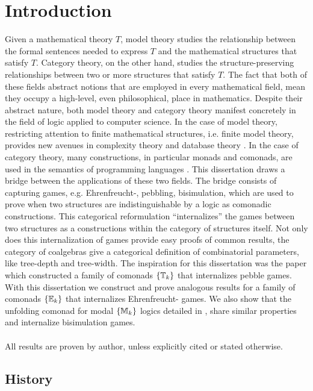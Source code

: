 \chapter{Introduction} 
Given a mathematical theory $T$, model theory studies the relationship between the formal sentences needed to express $T$ and the mathematical structures that satisfy $T$. Category theory, on the other hand, studies the structure-preserving relationships between two or more structures that satisfy $T$. The fact that both of these fields abstract notions that are employed in every mathematical field, mean they occupy a high-level, even philosophical\cite{Mancosu2010}\cite{Landry2017}, place in mathematics. Despite their abstract nature, both model theory and category theory manifest concretely in the field of logic applied to computer science. In the case of model theory, restricting attention to finite mathematical structures, i.e. finite model theory, provides new avenues in complexity theory \cite{Immerman1998} and database theory \cite{Abiteboul1995}. In the case of category theory, many constructions, in particular monads and comonads, are used in the semantics of programming languages \cite{BrookesGeva1992}. This dissertation draws a bridge between the applications of these two fields. The bridge consists of capturing games, e.g. Ehrenfreucht-{\Fraisse}, pebbling, bisimulation, which are used to prove when two structures are indistinguishable by a logic as comonadic constructions. This categorical reformulation ``internalizes'' the games between two structures as a constructions within the category of structures itself. Not only does this internalization of games provide easy proofs of common results, the category of coalgebras give a categorical definition of combinatorial parameters, like tree-depth and tree-width. The inspiration for this dissertation was the paper \cite{Abramsky2017} which constructed a family of comonads $\{{\mathbb{T}_{k}}\}$ that internalizes pebble games. With this dissertation we construct and prove analogous results for a family of comonads $\{{\mathbb{E}_{k}}\}$ that internalizes Ehrenfreucht-{\Fraisse} games. We also show that the unfolding comonad for modal $\{{\mathbb{M}_{k}}\}$ logics detailed in \cite{Gradel2014}, share similar properties and internalize bisimulation games.  
\\~\\
\noindent All results are proven by author, unless explicitly cited or stated otherwise. 
\section{History}
